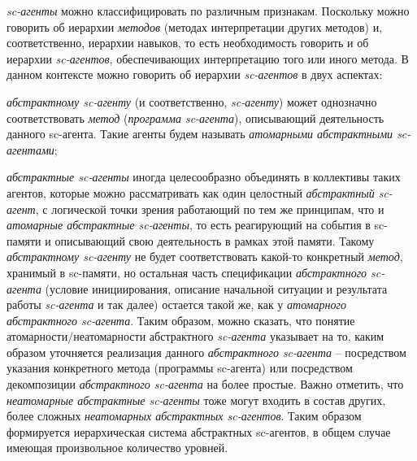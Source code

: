 \textit{sc-агенты} можно классифицировать по различным признакам. Поскольку можно говорить об иерархии \textit{методов} (методах интерпретации других методов) и, соответственно, иерархии навыков, то есть необходимость говорить и об иерархии \textit{sc-агентов}, обеспечивающих интерпретацию того или иного метода. В данном контексте можно говорить об иерархии \textit{sc-агентов} в двух аспектах:
\begin{textitemize}
	\item \textit{абстрактному sc-агенту} (и соответственно, \textit{sc-агенту}) может однозначно соответствовать \textit{метод} (\textit{программа sc-агента}), описывающий деятельность данного sc-агента. Такие агенты будем называть \textit{атомарными абстрактными sc-агентами};
	\item \textit{абстрактные sc-агенты} иногда целесообразно объединять в коллективы таких агентов, которые можно рассматривать как один целостный \textit{абстрактный sc-агент}, с логической точки зрения работающий по тем же принципам, что и \textit{атомарные абстрактные sc-агенты}, то есть реагирующий на события в sc-памяти и описывающий свою деятельность в рамках этой памяти. Такому \textit{абстрактному sc-агенту} не будет соответствовать какой-то конкретный \textit{метод}, хранимый в sc-памяти, но остальная часть спецификации \textit{абстрактного sc-агента} (условие инициирования, описание начальной ситуации и результата работы \textit{sc-агента} и так далее) остается такой же, как у \textit{атомарного абстрактного sc-агента}. Таким образом, можно сказать, что понятие атомарности/неатомарности абстрактного \textit{sc-агента} указывает на то, каким образом уточняется реализация данного \textit{абстрактного sc-агента} -- посредством указания конкретного метода (программы sc-агента) или посредством декомпозиции \textit{абстрактного sc-агента} на более простые. Важно отметить, что \textit{неатомарные абстрактные sc-агенты} тоже могут входить в состав других, более сложных \textit{неатомарных абстрактных sc-агентов}. Таким образом формируется иерархическая система абстрактных sc-агентов, в общем случае имеющая произвольное количество уровней. 

\end{textitemize}
